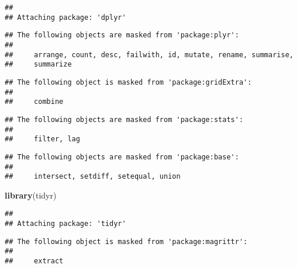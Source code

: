 \documentclass[
]{article}
\newenvironment{Shaded}{\begin{snugshade}}{\end{snugshade}}
\newcommand{\FunctionTok}[1]{\textcolor[rgb]{0.13,0.29,0.53}{\textbf{#1}}}
\newcommand{\NormalTok}[1]{#1}
\begin{document}
\begin{verbatim}
## 
## Attaching package: 'dplyr'
\end{verbatim}

\begin{verbatim}
## The following objects are masked from 'package:plyr':
## 
##     arrange, count, desc, failwith, id, mutate, rename, summarise,
##     summarize
\end{verbatim}

\begin{verbatim}
## The following object is masked from 'package:gridExtra':
## 
##     combine
\end{verbatim}

\begin{verbatim}
## The following objects are masked from 'package:stats':
## 
##     filter, lag
\end{verbatim}

\begin{verbatim}
## The following objects are masked from 'package:base':
## 
##     intersect, setdiff, setequal, union
\end{verbatim}

\begin{Shaded}
\begin{Highlighting}[]
\FunctionTok{library}\NormalTok{(tidyr)}
\end{Highlighting}
\end{Shaded}

\begin{verbatim}
## 
## Attaching package: 'tidyr'
\end{verbatim}

\begin{verbatim}
## The following object is masked from 'package:magrittr':
## 
##     extract
\end{verbatim}
\end{document}
